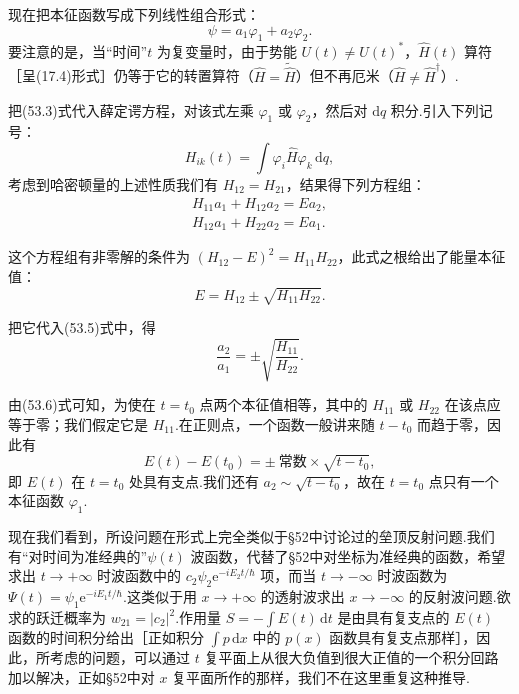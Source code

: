 现在把本征函数写成下列线性组合形式：
\begin{equation}
  \psi=a_1\varphi_1+a_2\varphi_2.
\end{equation}
要注意的是，当“时间”$t$ 为复变量时，由于势能 $U(t)\neq U(t)^*$，$\hat{H}(t)$ 算符［呈(17.4)形式］仍等于它的转置算符（$\hat{H}=\tilde{\hat{H}}$）但不再厄米（$\hat{H}\neq\hat{H}^{\dagger}$）.

把(53.3)式代入薛定谔方程，对该式左乘 $\varphi_1$ 或 $\varphi_2$，然后对 $\mathrm{d}q$ 积分.引入下列记号：
\begin{equation}
  H_{ik}(t)=\int\varphi_i\hat{H}\varphi_k\,\mathrm{d}q,
\end{equation}
考虑到哈密顿量的上述性质我们有 $H_{12}=H_{21}$，结果得下列方程组：
\begin{equation}
\begin{aligned}
  H_{11}a_1+H_{12}a_2=Ea_2,\\
  H_{12}a_1+H_{22}a_2=Ea_1.
\end{aligned}
\end{equation}

这个方程组有非零解的条件为 $(H_{12}-E)^2=H_{11}H_{22}$，此式之根给出了能量本征值：
\begin{equation}
  E=H_{12}\pm\sqrt{H_{11}H_{22}}.
\end{equation}

把它代入(53.5)式中，得
\begin{equation}
  \frac{a_2}{a_1}=\pm\sqrt{\frac{H_{11}}{H_{22}}}.
\end{equation}

由(53.6)式可知，为使在 $t=t_0$ 点两个本征值相等，其中的 $H_{11}$ 或 $H_{22}$ 在该点应等于零；我们假定它是 $H_{11}$.在正则点，一个函数一般讲来随 $t-t_0$ 而趋于零，因此有
\begin{equation}
  E(t)-E(t_0)=\pm\ \text{常数}\times\sqrt{t-t_0},
\end{equation}
即 $E(t)$ 在 $t=t_0$ 处具有支点.我们还有 $a_2\sim\sqrt{t-t_0}$，故在 $t=t_0$ 点只有一个本征函数 $\varphi_1$.

现在我们看到，所设问题在形式上完全类似于§52中讨论过的垒顶反射问题.我们有“对时间为准经典的”$\psi(t)$ 波函数，代替了§52中对坐标为准经典的函数，希望求出 $t\to+\infty$ 时波函数中的 $c_2\psi_2\mathrm{e}^{-iE_2t/\hbar}$ 项，而当 $t\to-\infty$ 时波函数为 $\Psi(t)=\psi_1\mathrm{e}^{-iE_1t/\hbar}$.这类似于用 $x\to+\infty$ 的透射波求出 $x\to-\infty$ 的反射波问题.欲求的跃迁概率为 $w_{21}=|c_2|^2$.作用量 $S=-\int E(t)\,\mathrm{d}t$ 是由具有复支点的 $E(t)$ 函数的时间积分给出［正如积分 $\int p\,\mathrm{d}x$ 中的 $p(x)$ 函数具有复支点那样］，因此，所考虑的问题，可以通过 $t$ 复平面上从很大负值到很大正值的一个积分回路加以解决，正如§52中对 $x$ 复平面所作的那样，我们不在这里重复这种推导.

